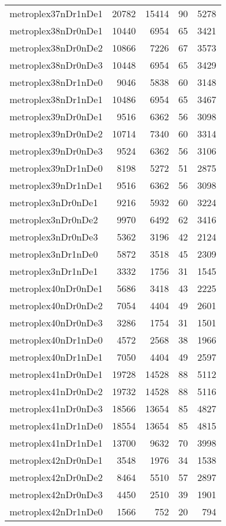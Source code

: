 \begin{longtable}{lrrrr}
metroplex37nDr1nDe1 & 20782 & 15414 & 90 & 5278 \\
metroplex38nDr0nDe1 & 10440 & 6954 & 65 & 3421 \\
metroplex38nDr0nDe2 & 10866 & 7226 & 67 & 3573 \\
metroplex38nDr0nDe3 & 10448 & 6954 & 65 & 3429 \\
metroplex38nDr1nDe0 & 9046 & 5838 & 60 & 3148 \\
metroplex38nDr1nDe1 & 10486 & 6954 & 65 & 3467 \\
metroplex39nDr0nDe1 & 9516 & 6362 & 56 & 3098 \\
metroplex39nDr0nDe2 & 10714 & 7340 & 60 & 3314 \\
metroplex39nDr0nDe3 & 9524 & 6362 & 56 & 3106 \\
metroplex39nDr1nDe0 & 8198 & 5272 & 51 & 2875 \\
metroplex39nDr1nDe1 & 9516 & 6362 & 56 & 3098 \\
metroplex3nDr0nDe1 & 9216 & 5932 & 60 & 3224 \\
metroplex3nDr0nDe2 & 9970 & 6492 & 62 & 3416 \\
metroplex3nDr0nDe3 & 5362 & 3196 & 42 & 2124 \\
metroplex3nDr1nDe0 & 5872 & 3518 & 45 & 2309 \\
metroplex3nDr1nDe1 & 3332 & 1756 & 31 & 1545 \\
metroplex40nDr0nDe1 & 5686 & 3418 & 43 & 2225 \\
metroplex40nDr0nDe2 & 7054 & 4404 & 49 & 2601 \\
metroplex40nDr0nDe3 & 3286 & 1754 & 31 & 1501 \\
metroplex40nDr1nDe0 & 4572 & 2568 & 38 & 1966 \\
metroplex40nDr1nDe1 & 7050 & 4404 & 49 & 2597 \\
metroplex41nDr0nDe1 & 19728 & 14528 & 88 & 5112 \\
metroplex41nDr0nDe2 & 19732 & 14528 & 88 & 5116 \\
metroplex41nDr0nDe3 & 18566 & 13654 & 85 & 4827 \\
metroplex41nDr1nDe0 & 18554 & 13654 & 85 & 4815 \\
metroplex41nDr1nDe1 & 13700 & 9632 & 70 & 3998 \\
metroplex42nDr0nDe1 & 3548 & 1976 & 34 & 1538 \\
metroplex42nDr0nDe2 & 8464 & 5510 & 57 & 2897 \\
metroplex42nDr0nDe3 & 4450 & 2510 & 39 & 1901 \\
metroplex42nDr1nDe0 & 1566 & 752 & 20 & 794 \\

\end{longtable}
